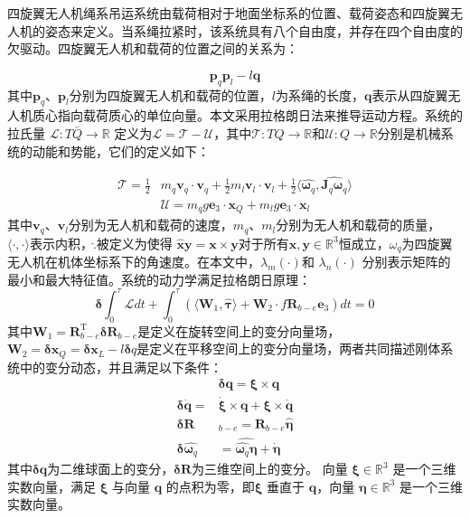 \documentclass[lang=chs, degree=master, blindreview=false, winfonts=true]{yanputhesis}
\begin{document}
四旋翼无人机绳系吊运系统由载荷相对于地面坐标系的位置、载荷姿态和四旋翼无人机的姿态来定义。当系绳拉紧时，该系统具有八个自由度，并存在四个自由度的欠驱动。四旋翼无人机和载荷的位置之间的关系为：

\begin{equation}
	\bm p_q\bm p_l-l\bm q
\end{equation}
其中$\bm p_q$、$\bm p_l$分别为四旋翼无人机和载荷的位置，$l$为系绳的长度，$\bm q$表示从四旋翼无人机质心指向载荷质心的单位向量。本文采用拉格朗日法来推导运动方程。系统的拉氏量 $\mathcal{L}:T\bar{Q}\to\mathbb{R}$ 定义为$\mathcal{L}=\mathcal{T}-\mathcal{U}$，其中$\mathcal{T}:TQ\to\mathbb{R}$和${\mathcal{U}}:Q\to\mathbb{R}$分别是机械系统的动能和势能，它们的定义如下：

\begin{equation}
\begin{aligned}
	\mathcal{T}=\frac{1}{2}&m_{q}\bm v_{q}\cdot \bm v_{q}+\frac{1}{2}m_{l}\bm v_{l}\cdot \bm v_{l}+\frac{1}{2}\langle\hat{\bm  \omega_q},\widehat{\bm J_{q}\bm  \omega_q}\rangle\\
	&\mathcal{U}=m_{q}g\bm e_{3}\cdot \bm x_{Q}+m_{l}g\bm e_{3}\cdot \bm x_{l}
\end{aligned}
	\label{2-9}
\end{equation}
其中$\bm v_q$、$\bm v_l$分别为无人机和载荷的速度，$m_q$、$m_l$分别为无人机和载荷的质量，$\langle\cdot,\cdot\rangle $表示内积，$\hat{.}$被定义为使得 $\hat{\bm x}\bm y=\bm x\times \bm y$对于所有$\bm x,\bm y\in\mathbb{R}^3$恒成立，$\omega_q$为四旋翼无人机在机体坐标系下的角速度。在本文中，$\lambda_m(\cdot)$和 $\lambda_n(\cdot)$ 分别表示矩阵的最小和最大特征值。系统的动力学满足拉格朗日原理：
\begin{equation}
	\bm \delta\int_0^\tau\mathcal{L} dt+\int_0^\tau\left(\langle \bm W_1,\hat{\bm \tau}\rangle+\bm W_2\cdot f\bm{R}_{b-e}\bm e_3\right) dt=0
	\label{2-10}
\end{equation}
其中$\bm W_{1}=\bm R_{b-e}^\mathrm{T}\bm \delta \bm R_{b-e}$是定义在旋转空间上的变分向量场， $ \bm W_{2}=\bm \delta \bm x_{Q}=\bm \delta \bm x_{L}-l\bm \delta q$是定义在平移空间上的变分向量场，两者共同描述刚体系统中的变分动态，并且满足以下条件：
\begin{equation}
	\begin{aligned}
	&\bm \delta \bm q = \bm \xi \times \bm q\\
	\bm \delta \dot{\bm q} = &\dot{\bm \xi} \times \bm q + \bm \xi \times \dot{\bm q} \\
	\bm \delta\bm  R&_{b-e} = \bm R_{b-e} \hat{\bm \eta} \\
	\bm \delta \hat{\bm  \omega _q}& = \widehat{\hat{\bm  \omega_q} \bm \eta} + \hat{\dot{\bm \eta}}
\end{aligned}
\end{equation}
其中$\bm \delta \bm q$为二维球面上的变分，$\bm \delta \bm R$为三维空间上的变分。
向量 $\bm{\xi} \in \mathbb{R}^3$ 是一个三维实数向量，满足 $\bm{\xi}$ 与向量 $\bm{q}$ 的点积为零，即$\bm{\xi}$ 垂直于 $\bm{q}$，向量 $\bm{\eta} \in \mathbb{R}^3$ 是一个三维实数向量。
\end{document}
